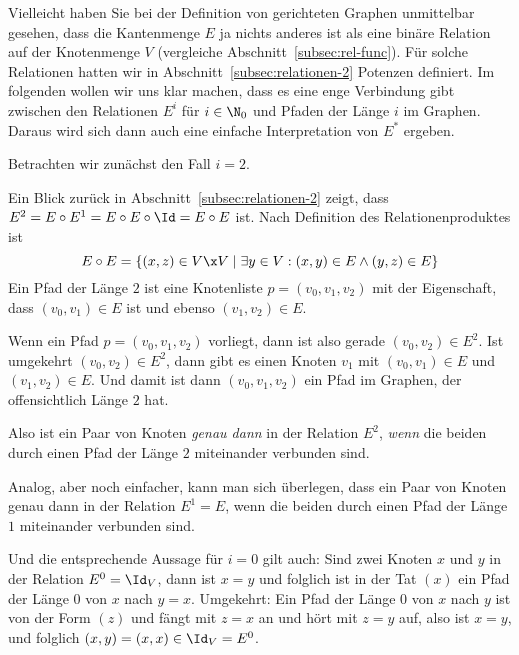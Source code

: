 Vielleicht haben Sie bei der Definition von gerichteten Graphen
unmittelbar gesehen, dass die Kantenmenge $E$ ja nichts anderes ist
als eine binäre Relation auf der Knotenmenge $V$ (vergleiche
Abschnitt~\ref{subsec:rel-func}).
% 
Für solche Relationen hatten wir in
Abschnitt~\ref{subsec:relationen-2} Potenzen definiert.
% 
Im folgenden wollen wir uns klar machen, dass es eine enge Verbindung
gibt zwischen den Relationen $E^i$ für $i\in\N_0$ und Pfaden der Länge
$i$ im Graphen.
% 
Daraus wird sich dann auch eine einfache Interpretation von $E^*$
ergeben.

Betrachten wir zunächst den Fall $i=2$.

Ein Blick zurück in Abschnitt~\ref{subsec:relationen-2} zeigt, dass
$E^2=E \circ E^1=E \circ E\circ \Id=E\circ E$ ist.
% 
Nach Definition des Relationenproduktes ist
\[ E\circ E = \{ (x,z)\in V\x V \mid \exists y\in V: (x,y)\in E \land
(y,z)\in E \}
\]
% 
Ein Pfad der Länge $2$ ist eine Knotenliste $p=(v_0,v_1,v_2)$ mit der
Eigenschaft, dass $(v_0,v_1)\in E$ ist und ebenso $(v_1,v_2)\in E$.

Wenn ein Pfad $p=(v_0,v_1,v_2)$ vorliegt, dann ist also gerade
$(v_0,v_2)\in E^2$.
% 
Ist umgekehrt $(v_0,v_2)\in E^2$, dann gibt es einen Knoten $v_1$ mit
$(v_0,v_1)\in E$ und $(v_1,v_2)\in E$.
% 
Und damit ist dann $(v_0,v_1,v_2)$ ein Pfad im Graphen, der
offensichtlich Länge $2$ hat.

Also ist ein Paar von Knoten \emph{genau dann} in der Relation $E^2$,
\emph{wenn} die beiden durch einen Pfad der Länge $2$ miteinander
verbunden sind.

Analog, aber noch einfacher, kann man sich überlegen, dass ein Paar
von Knoten genau dann in der Relation $E^1=E$, wenn die beiden durch
einen Pfad der Länge $1$ miteinander verbunden sind.

Und die entsprechende Aussage für $i=0$ gilt auch: Sind zwei Knoten
$x$ und $y$ in der Relation $E^0=\Id_V$, dann ist $x=y$ und folglich
ist in der Tat $(x)$ ein Pfad der Länge $0$ von $x$ nach $y=x$.
Umgekehrt: Ein Pfad der Länge $0$ von $x$ nach $y$ ist von der Form
$(z)$ und fängt mit $z=x$ an und hört mit $z=y$ auf, also ist $x=y$,
und folglich $(x,y)=(x,x)\in \Id_V=E^0$.

